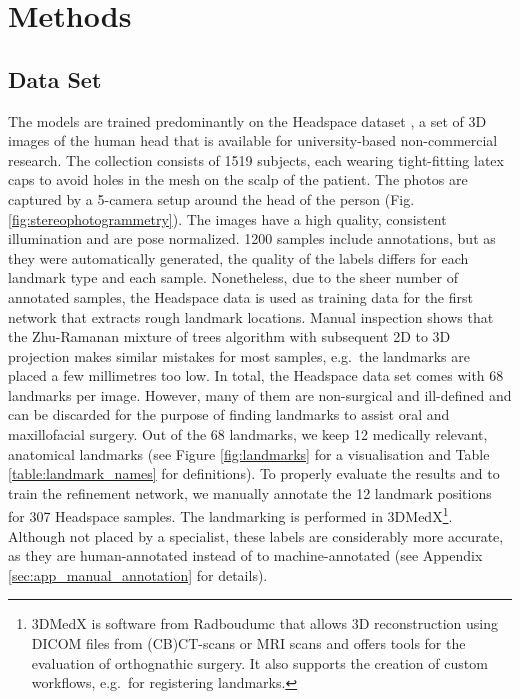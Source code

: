 \documentclass[class=article, crop=false]{standalone}
\begin{document}
\section{Methods}
\label{sec:methods}

\subsection{Data Set}\label{sec:data_preparation}The models are trained predominantly on the Headspace dataset \cite{Dai2019}, a set of 3D images of the human head that is available for university-based non-commercial research. The collection consists of 1519 subjects, each wearing tight-fitting latex caps to avoid holes in the mesh on the scalp of the patient. The photos are captured by a 5-camera setup around the head of the person (Fig. \ref{fig:stereophotogrammetry}).
The images have a high quality, consistent illumination and are pose normalized. 1200 samples include annotations, but as they were automatically generated, the quality of the labels differs for each landmark type and each sample. Nonetheless, due to the sheer number of annotated samples, the Headspace data is used as training data for the first network that extracts rough landmark locations. Manual inspection shows that the Zhu-Ramanan mixture of trees algorithm with subsequent 2D to 3D projection makes similar mistakes for most samples, e.g.\ the landmarks are placed a few millimetres too low. %
In total, the Headspace data set comes with 68 landmarks per image. However, many of them are non-surgical and ill-defined and can be discarded for the purpose of finding landmarks to assist oral and maxillofacial surgery. Out of the 68 landmarks, we keep 12 medically relevant, anatomical landmarks (see Figure \ref{fig:landmarks} for a visualisation and Table \ref{table:landmark_names} for definitions). To properly evaluate the results and to train the refinement network, we manually annotate the 12 landmark positions for 307 Headspace samples. The landmarking is performed in 3DMedX\footnote{3DMedX is software from Radboudumc that allows 3D reconstruction using DICOM files from (CB)CT-scans or MRI scans and offers tools for the evaluation of orthognathic surgery. It also supports the creation of custom workflows, e.g.\ for registering landmarks.}\cite{3dmedx}. Although not placed by a specialist, these labels are considerably more accurate, as they are human-annotated instead of to machine-annotated (see Appendix \ref{sec:app_manual_annotation} for details).
\end{document}
